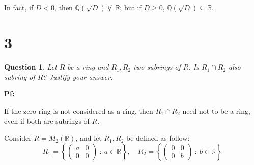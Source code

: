 \documentclass{article}
\newtheorem{question}{Question}
\begin{document}
In fact, if $D<0$, then $\mathbb{Q}(\sqrt{D})\not\subseteq \mathbb{R}$; but if $D \geq 0$, $\mathbb{Q}(\sqrt{D}) \subseteq \mathbb{R}$.

\break

\section*{3}
\begin{question}
    Let $R$ be a ring and $R_1,R_2$ two subrings of $R$. Is $R_1\cap R_2$ also subring of $R$? Justify your answer.
\end{question}

\textbf{Pf:}

If the zero-ring is not considered as a ring, then $R_1\cap R_2$ need not to be a ring, even if both are subrings of $R$.

Consider $R = M_2(\mathbb{R})$, and let $R_1,R_2$ be defined as follow:
$$R_1 = \left\{\begin{pmatrix}
    a&0\\0&0
\end{pmatrix}\ :\ a\in\mathbb{R}\right\},\quad R_2=\left\{\begin{pmatrix}
    0&0\\0&b
\end{pmatrix}\ :\ b\in\mathbb{R}\right\}$$
\end{document}
